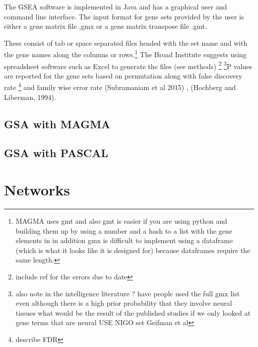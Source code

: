 The GSEA software is implemented in Java and has a graphical user and command line interface. The input format for gene sets provided by the user is either a gene matrix file ,gmx or a gene matrix transpose file .gmt.

These consist of tab or space separated files headed with the set name and with the gene names along the columns or rows.\footnote{MAGMA uses gmt and also gmt is easier if you are using python and building them up by using a number and a hash to a list with the gene elements in in addition gmx is difficult to implement using a dataframe (which is what it looks like it is designed for) because dataframes require the same length.} The Broad Institute suggests using spreadsheet software such as Excel to generate the files (see methods) \footnote{include ref for the errors due to date} \footnote{also note in the intelligence literature ? have people used the full gmx list even although there is a high prior probability that they involve neural tissues what would be the result of the published studies if we only looked at gene terms that are neural USE NIGO set   Geifman et al}P values are reported for the gene sets based on permutation along with false discovery rate \cite{benjamini1995controlling}\footnote{describe FDR} and family wise error rate (Subramaniam et al 2015) , (Hochberg and Liberman, 1994).

\subsection{GSA with MAGMA}

\subsection{GSA with PASCAL}
\cite{lamparter2016fast}
\section{Networks}
\label{sec:networks_intro}

